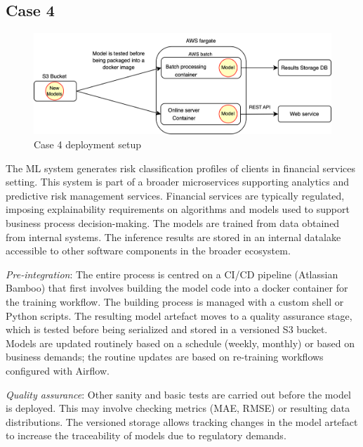 \subsection*{Case 4} %
\label{case: 4}
\begin{figure}[t]
\centering
\includegraphics[width=\linewidth]{images/case4_deployment_process.png}
\caption{Case 4 deployment setup}
\label{fig: case4_deployment_process}
\end{figure}


The ML system generates risk classification profiles of clients in financial services setting. This system is part of a broader microservices supporting analytics and predictive risk management services. Financial services are typically regulated, imposing explainability requirements on algorithms and models used to support business process decision-making. The models are trained from data obtained from internal systems. The inference results are stored in an internal datalake accessible to other software components in the broader ecosystem. 

\textit{Pre-integration}: The entire process is centred on a CI/CD pipeline (Atlassian Bamboo) that first involves building the model code into a docker container for the training workflow. The building process is managed with a custom shell or Python scripts. The resulting model artefact moves to a quality assurance stage, which is tested before being serialized and stored in a versioned S3 bucket. Models are updated routinely based on a schedule (weekly, monthly) or based on business demands; the routine updates are based on re-training workflows configured with Airflow.

\textit{Quality assurance}: Other sanity and basic tests are carried out before the model is deployed. This may involve checking metrics (MAE, RMSE) or resulting data distributions.
The versioned storage allows tracking changes in the model artefact to increase the traceability of models due to regulatory demands. 

